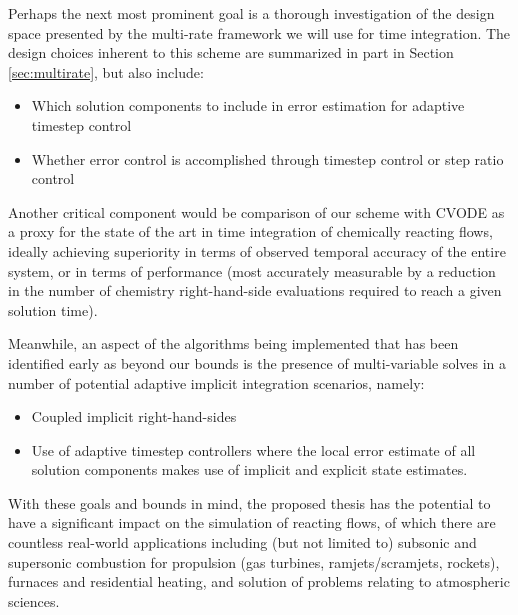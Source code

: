 Perhaps the next most prominent goal is a thorough investigation of
the design space presented by the multi-rate framework we will use for time
integration. The design choices inherent to this scheme are summarized in part
in Section \ref{sec:multirate}, but also include:
\begin{itemize}
\item{Which solution components to include in error estimation for adaptive timestep
      control}
\item{Whether error control is accomplished through timestep control or step ratio control}
\end{itemize}
Another critical component would be comparison of our scheme with CVODE as
a proxy for the state of the art in time integration of chemically reacting
flows, ideally achieving superiority in terms of observed temporal accuracy
of the entire system, or in terms of performance (most accurately measurable
by a reduction in the number of chemistry right-hand-side evaluations required
to reach a given solution time).

Meanwhile, an aspect of the algorithms being implemented that has been identified
early as beyond our bounds is the presence of multi-variable solves in a number of
potential adaptive implicit integration scenarios, namely:
\begin{itemize}
\item{Coupled implicit right-hand-sides}
\item{Use of adaptive timestep controllers where the local error estimate
      of all solution components makes use of implicit and explicit state
      estimates.}
\end{itemize}

With these goals and bounds in mind, the proposed thesis has the potential to
have a significant impact on the simulation of reacting flows, of which there
are countless real-world applications including (but not limited to) subsonic
and supersonic combustion for propulsion (gas turbines, ramjets/scramjets,
rockets), furnaces and residential heating, and solution of problems relating
to atmospheric sciences.

